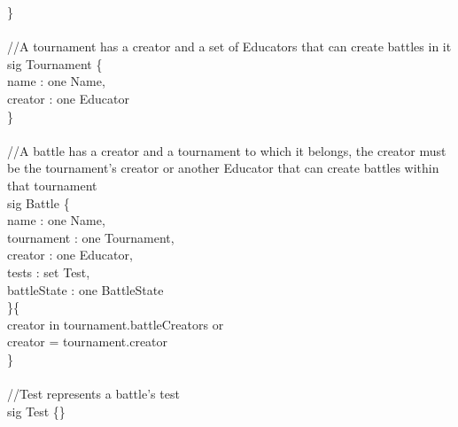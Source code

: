 \documentclass{article}
\begin{document}
{\}\\
\\
\color{gray}
//A tournament has a creator and a set of Educators that can create battles in it\\
\color{blue}
sig
\color{black}
Tournament \{ \\
\-\hspace{1cm}    name : \color{blue} one \color{black} Name,\\
\-\hspace{1cm}    creator : \color{blue} one \color{black} Educator\\
\}\\
\color{gray}
\\
//A battle has a creator and a tournament to which it belongs, the creator must be the tournament's creator or another Educator that can create battles within that tournament\\
\color{blue}
sig
\color{black}
Battle \{\\
\-\hspace{1cm}    name : \color{blue} one \color{black} Name,\\
\-\hspace{1cm}    tournament : \color{blue} one \color{black} Tournament,\\
\-\hspace{1cm}    creator : \color{blue} one \color{black} Educator,\\
\-\hspace{1cm}	tests : \color{blue} set \color{black} Test,\\
\-\hspace{1cm}	battleState : \color{blue} one \color{black} BattleState\\
\}\{\\
\-\hspace{1cm}	creator \color{blue} in \color{black} tournament.battleCreators \color{blue} or \color{black}\\
\-\hspace{1cm}	creator \color{blue} = \color{black} tournament.creator\\
\}\\
\color{gray}
\\
//Test represents a battle's test\\
\color{blue}
sig
\color{black}
Test \{\}\\

}
\end{document}
